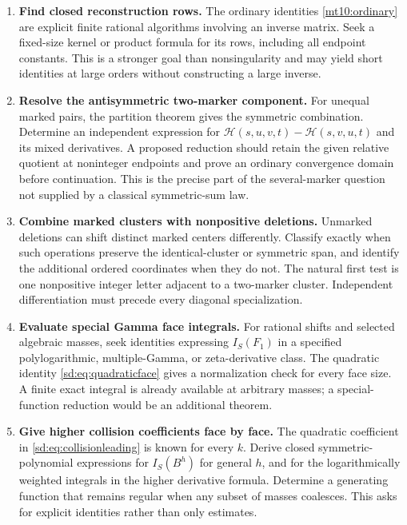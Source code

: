 \begin{enumerate}[label=\textbf{R\arabic*.}]
\item \textbf{Find closed reconstruction rows.}
The ordinary identities \eqref{mt10:ordinary} are explicit finite
rational algorithms involving an inverse matrix. Seek a fixed-size
kernel or product formula for its rows, including all endpoint
constants. This is a stronger goal than nonsingularity and may yield
short identities at large orders without constructing a large inverse.

\item \textbf{Resolve the antisymmetric two-marker component.}
For unequal marked pairs, the partition theorem gives the symmetric
combination. Determine an independent expression for
$\mathcal H(s,u,v,t)-\mathcal H(s,v,u,t)$ and its mixed derivatives.
A proposed reduction should retain the given relative quotient at
noninteger endpoints and prove an ordinary convergence domain before
continuation. This is the precise part of the several-marker question
not supplied by a classical symmetric-sum law.

\item \textbf{Combine marked clusters with nonpositive deletions.}
Unmarked deletions can shift distinct marked centers differently.
Classify exactly when such operations preserve the identical-cluster
or symmetric span, and identify the additional ordered coordinates
when they do not. The natural first test is one nonpositive integer
letter adjacent to a two-marker cluster. Independent differentiation
must precede every diagonal specialization.

\item \textbf{Evaluate special Gamma face integrals.}
For rational shifts and selected algebraic masses, seek identities
expressing $I_S(F_1)$ in a specified polylogarithmic, multiple-Gamma,
or zeta-derivative class. The quadratic identity
\eqref{sd:eq:quadraticface} gives a normalization check for every face
size. A finite exact integral is already available at arbitrary masses;
a special-function reduction would be an additional theorem.

\item \textbf{Give higher collision coefficients face by face.}
The quadratic coefficient in \eqref{sd:eq:collisionleading} is known
for every $k$. Derive closed symmetric-polynomial expressions for
$I_S(B^h)$ for general $h$, and for the logarithmically weighted
integrals in the higher derivative formula. Determine a generating
function that remains regular when any subset of masses coalesces.
This asks for explicit identities rather than only estimates.


\end{enumerate}
